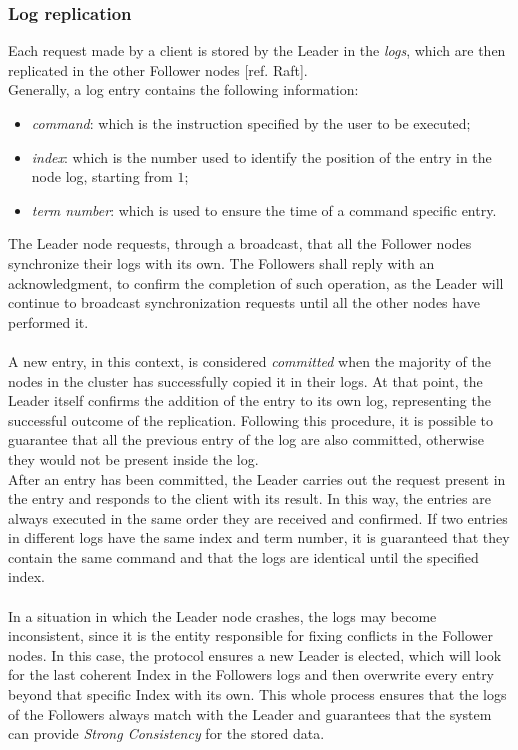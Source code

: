 \subsubsection{Log replication}\label{etcd-replication}
Each request made by a client is stored by the Leader in the \textit{logs}, which are then replicated in the other Follower nodes [ref. Raft]. \\
Generally, a log entry contains the following information:
\begin{itemize}
	\item \textit{command}: which is the instruction specified by the user to be executed;
	\item \textit{index}: which is the number used to identify the position of the entry in the node log, starting from $1$;
	\item \textit{term number}: which is used to ensure the time of a command specific entry.
\end{itemize}
The Leader node requests, through a broadcast, that all the Follower nodes synchronize their logs with its own. The Followers shall reply with an acknowledgment, to confirm the completion of such operation, as the Leader will continue to broadcast synchronization requests until all the other nodes have performed it. \\ \\
A new entry, in this context, is considered \textit{committed} when the majority of the nodes in the cluster has successfully copied it in their logs. At that point, the Leader itself confirms the addition of the entry to its own log, representing the successful outcome of the replication. Following this procedure, it is possible to guarantee that all the previous entry of the log are also committed, otherwise they would not be present inside the log. \\
After an entry has been committed, the Leader carries out the request present in the entry and responds to the client with its result. In this way, the entries are always executed in the same order they are received and confirmed. If two entries in different logs have the same index and term number, it is guaranteed that they contain the same command and that the logs are identical until the specified index. \\ \\
In a situation in which the Leader node crashes, the logs may become inconsistent, since it is the entity responsible for fixing conflicts in the Follower nodes. In this case, the protocol ensures a new Leader is elected, which will look for the last coherent Index in the Followers logs and then overwrite every entry beyond that specific Index with its own. This whole process ensures that the logs of the Followers always match with the Leader and guarantees that the system can provide \textit{Strong Consistency} for the stored data.

